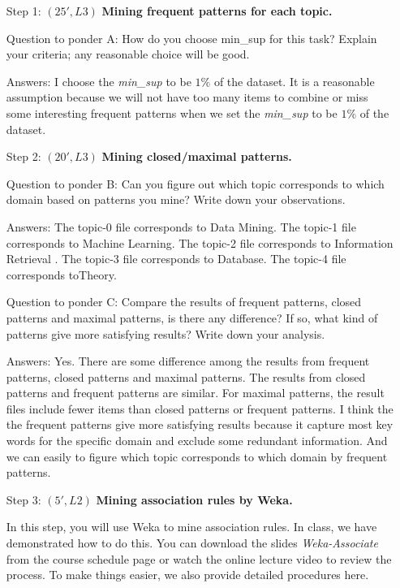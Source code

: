 \begin{enumerate}
\item[Step 1:] $(25', L3)$ \textbf{Mining frequent patterns for each topic.} 
  
Question to ponder A: How do you choose min\_sup for this task? Explain your criteria; any reasonable choice will be good.

Answers: I choose the {\it min\_sup} to be $1\%$ of the dataset. It is a reasonable assumption because we will not have too many items to combine or miss some interesting frequent patterns when we set the {\it min\_sup} to be $1\%$ of the dataset.
  
\item[Step 2:] $(20', L3)$ \textbf{Mining closed/maximal patterns.} 

Question to ponder B: Can you figure out which topic corresponds to which domain based on patterns you mine? Write down your observations.

Answers: The topic-0 file corresponds to Data Mining. The topic-1 file corresponds to Machine Learning. The topic-2 file corresponds to Information Retrieval . The topic-3 file corresponds to Database. The topic-4 file corresponds toTheory. 

Question to ponder C: Compare the results of frequent patterns, closed patterns and maximal patterns, is there any difference? If so, what kind of patterns give more satisfying results? Write down your analysis.

Answers: Yes. There are some difference among the results from frequent patterns, closed patterns and maximal patterns. The results from closed patterns and frequent patterns are similar. For maximal patterns, the result files include fewer items than closed patterns or frequent patterns. I think the the frequent patterns give more satisfying results because it capture most key words for the specific domain and exclude some redundant information. And we can easily to figure which topic corresponds to which domain by frequent patterns.
 
\item[Step 3:] $(5', L2)$  \textbf{Mining association rules by Weka.} 

In this step, you will use Weka to mine association rules. In class, we have demonstrated how to do this. You can download the slides \textit{Weka-Associate} from the course schedule page or watch the online lecture video to review the process. To make things easier, we also provide detailed procedures here. 


\end{enumerate}
